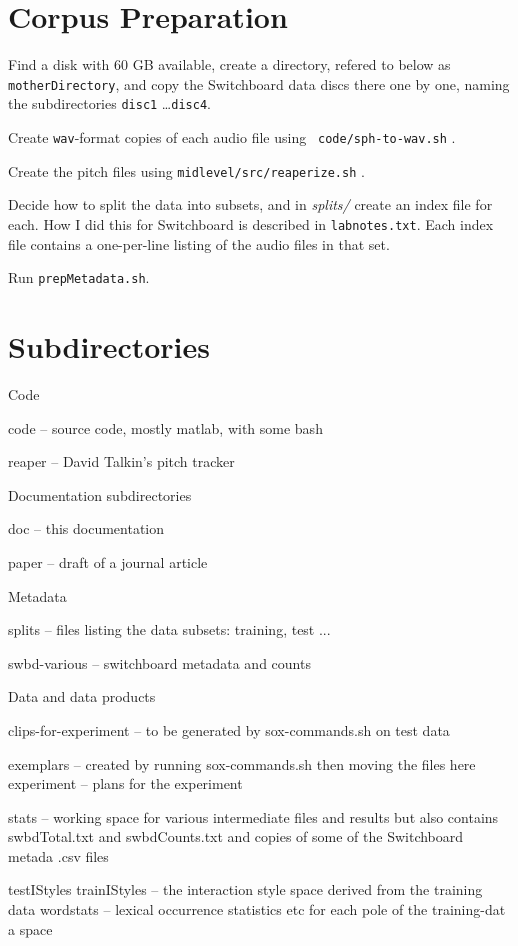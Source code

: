 \documentclass[11pt]{article}
\begin{document}
\section{Corpus Preparation }

Find a disk with 60 GB available, create a directory, refered to below
as {\tt motherDirectory}, and copy the Switchboard data discs there
one by one, naming the subdirectories {\tt disc1} \ldots {\tt disc4}.

Create {\tt wav}-format copies of each audio file using {\tt
  code/sph-to-wav.sh} .

Create the pitch files using {\tt midlevel/src/reaperize.sh} .

Decide how to split the data into subsets, and in {\it splits/} create
an index file for each. How I did this for Switchboard is described in
{\tt labnotes.txt}.  Each index file contains a one-per-line listing
of the audio files in that set.

Run {\tt prepMetadata.sh}.

\section{Subdirectories}

Code 

\begin{description}
\item{code} -- source code, mostly matlab, with some bash
\item{reaper} --  David Talkin's pitch tracker 
\end{description}

Documentation subdirectories 
\begin{description}
\item{doc} -- this documentation
\item{paper} -- draft of a journal article
\end{description}

Metadata
\begin{description}
\item{splits} -- files listing the data subsets: training, test ...
\item{swbd-various} -- switchboard metadata and counts
\end{description} 


Data and data products
\begin{description}
clips-for-experiment -- to be generated by sox-commands.sh on test data

exemplars -- created by running sox-commands.sh then moving the files here
experiment -- plans for the experiment

stats -- working space for various intermediate files and results
   but also contains swbdTotal.txt and swbdCounts.txt
   and copies of some of the Switchboard metada .csv files

testIStyles
trainIStyles -- the interaction style space derived from the training data
wordstats -- lexical occurrence statistics etc for each pole of the training-dat
a space
\end{description}
\end{document}
